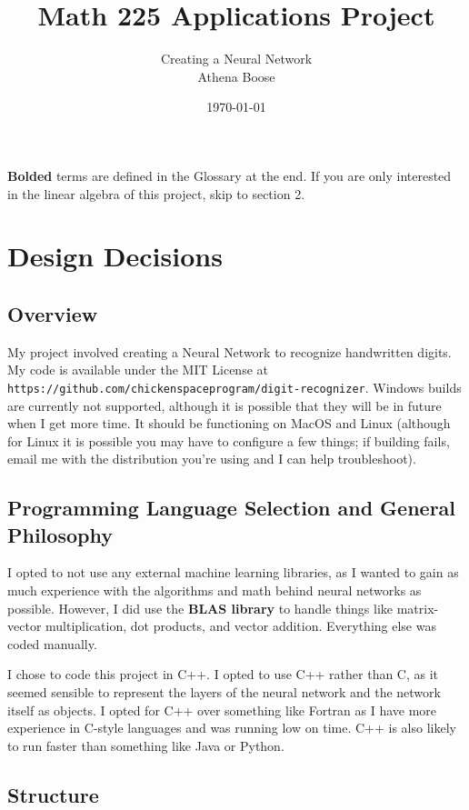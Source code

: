 \documentclass[12pt]{article}
\author{Creating a Neural Network\bigskip\\Athena Boose}
\title{Math 225 Applications Project}
\date{\today}
\begin{document}
\maketitle

\textbf{Bolded} terms are defined in the Glossary at the end.
If you are only interested in the linear algebra of this project, skip to section 2.

\section{Design Decisions}

\subsection{Overview}

My project involved creating a Neural Network to recognize handwritten digits.
My code is available under the MIT License at \verb|https://github.com/chickenspaceprogram/digit-recognizer|.
Windows builds are currently not supported, although it is possible that they will be in future when I get more time.
It should be functioning on MacOS and Linux (although for Linux it is possible you may have to configure a few things; if building fails, email me with the distribution you're using and I can help troubleshoot).

\subsection{Programming Language Selection and General Philosophy}

I opted to not use any external machine learning libraries, as I wanted to gain as much experience with the algorithms and math behind neural networks as possible.
However, I did use the \textbf{BLAS library} to handle things like matrix-vector multiplication, dot products, and vector addition.
Everything else was coded manually.

I chose to code this project in C++.
I opted to use C++ rather than C, as it seemed sensible to represent the layers of the neural network and the network itself as objects.
I opted for C++ over something like Fortran as I have more experience in C-style languages and was running low on time.
C++ is also likely to run faster than something like Java or Python.

\subsection{Structure}
\end{document}
